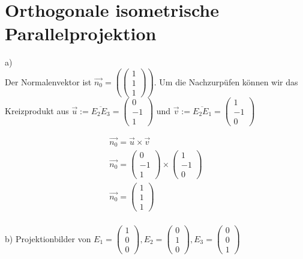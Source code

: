 
\setcounter{H-section}{18}
\renewcommand*\thesection{H\Nummerierung{\arabic{H-section}}}
\section{Orthogonale isometrische Parallelprojektion}


a)\\

Der Normalenvektor ist \ensuremath{\vec{n_0} = (\begin{pmatrix}
		1\\1\\1
	\end{pmatrix})}. Um die Nachzurpüfen können wir das Kreizprodukt aus \ensuremath{\vec{u} := \overline{E_2E_3} = \begin{pmatrix}
	0\\-1\\1
\end{pmatrix} } und \ensuremath{\vec{v} := \overline{E_2E_1} = \begin{pmatrix}
1\\-1\\0
\end{pmatrix} }

\begin{gather}
	\vec{n_0} = \vec{u} \times \vec{v}\\
	\vec{n_0} = \begin{pmatrix}
	0\\-1\\1
	\end{pmatrix} \times 
	\begin{pmatrix}
	1\\-1\\0
	\end{pmatrix}\\
	\vec{n_0} = \begin{pmatrix}
	1\\1\\1
	\end{pmatrix}
\end{gather} \\

b) Projektionbilder von \ensuremath{E_1  = \begin{pmatrix}
		1\\0\\0
\end{pmatrix}, E_2 = \begin{pmatrix}
0\\1\\0
\end{pmatrix}, E_3 = \begin{pmatrix}
0\\0\\1
\end{pmatrix}}\\


